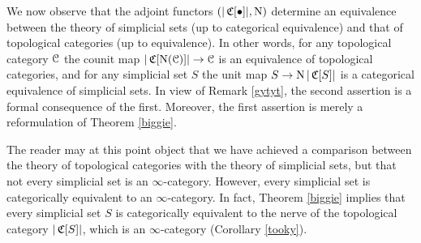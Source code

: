 \begin{1.1.5 inf-cats vs simplicial cats}
We now observe that the adjoint functors $(|\operatorname{\mathfrak{C}}[ \bullet ]|, \operatorname{N} )$
determine an equivalence between the theory of simplicial sets (up to categorical equivalence)
and that of topological categories (up to equivalence). In other words, for any
topological category $\operatorname{\mathcal{C}}$ the counit map
$|\operatorname{\mathfrak{C}}[ \operatorname{N}(\operatorname{\mathcal{C}})] | \rightarrow \operatorname{\mathcal{C}}$ is an equivalence of topological categories, and for any simplicial set $S$ the unit map
$S \rightarrow \operatorname{N} |\operatorname{\mathfrak{C}}[S]|$
is a categorical equivalence of simplicial sets. In view of Remark \ref{gytyt}, the second assertion is a formal consequence of the first. Moreover, the first assertion is merely a reformulation of Theorem \ref{biggie}.

\begin{remark}
The reader may at this point object that we have achieved a comparison between the theory of topological categories with the theory of simplicial sets, but that not every simplicial set is an $\infty$-category. However, every simplicial set is categorically equivalent to an $\infty$-category. In fact, Theorem \ref{biggie} implies that every simplicial set $S$ is categorically equivalent to the nerve of the topological category $| \operatorname{\mathfrak{C}}[S] |$, which is an $\infty$-category (Corollary \ref{tooky}).
\end{remark}
\end{1.1.5 inf-cats vs simplicial cats}


